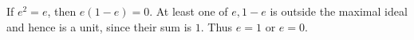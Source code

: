 If $e^2=e$, then $e(1-e)=0$. At least one of $e,1-e$ is outside the maximal ideal and hence is a unit, since their sum is $1$. Thus $e=1$ or $e=0$.
